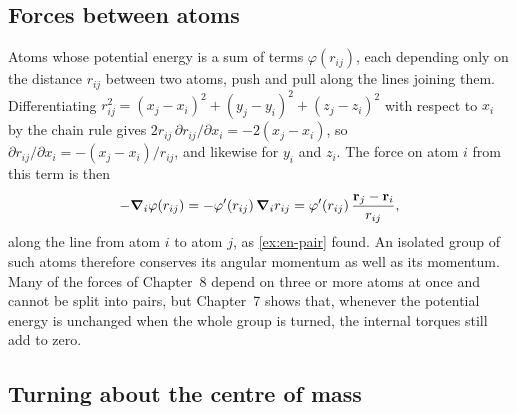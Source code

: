 \subsection*{Forces between atoms}

Atoms whose potential energy is a sum of terms $\varphi(r_{ij})$, each
depending only on the distance $r_{ij}$ between two atoms, push and pull
along the lines joining them. Differentiating $r_{ij}^2 = (x_j - x_i)^2 +
(y_j - y_i)^2 + (z_j - z_i)^2$ with respect to $x_i$ by the chain rule
gives $2r_{ij}\,\partial r_{ij}/\partial x_i = -2(x_j - x_i)$, so
$\partial r_{ij}/\partial x_i = -(x_j - x_i)/r_{ij}$, and likewise for $y_i$
and $z_i$. The force on atom $i$ from this term is then
\begin{equation*}
   -\bm{\nabla}_i\varphi(r_{ij}) = -\varphi'(r_{ij})\,\bm{\nabla}_i r_{ij}
   = \varphi'(r_{ij})\,\frac{\bm{\mathrm{r}}_j - \bm{\mathrm{r}}_i}{r_{ij}} ,
\end{equation*}
along the line from atom $i$ to atom $j$, as \cref{ex:en-pair} found. An
isolated group of such atoms therefore conserves its angular momentum as
well as its momentum. Many of the forces of Chapter~8 depend on three or more atoms
at once and cannot be split into pairs, but Chapter~7 shows that, whenever
the potential energy is unchanged when the whole group is turned, the
internal torques still add to zero.

\subsection*{Turning about the centre of mass}

